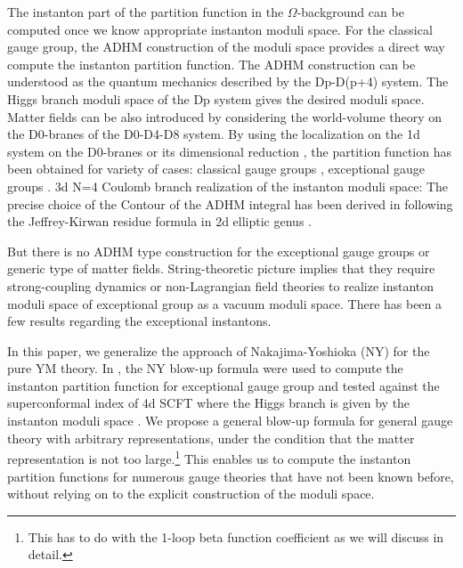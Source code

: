 \documentclass[letterpaper, 11pt]{article}
\begin{document}
The instanton part of the partition function in the $\Omega$-background can be computed once we know appropriate instanton moduli space. For the classical gauge group, the ADHM construction of the moduli space provides a direct way compute the instanton partition function. The ADHM construction can be understood as the quantum mechanics described by the Dp-D(p+4) system. The Higgs branch moduli space of the Dp system gives the desired moduli space. Matter fields can be also introduced by considering the world-volume theory on the D0-branes of the D0-D4-D8 system. 
By using the localization on the 1d system on the D0-branes or its dimensional reduction \cite{Moore:1997dj, Bruzzo:2002xf}, the partition function has been obtained for variety of cases: classical gauge groups \cite{Nekrasov:2004vw, Marino:2004cn, Fucito:2004gi, Hollands:2010xa, Hollands:2011zc}, exceptional gauge groups \cite{Benvenuti:2010pq, Keller:2011ek, Keller:2012da, Hanany:2012dm}. 
3d N=4 Coulomb branch realization of the instanton moduli space: \cite{Cremonesi:2014xha}
The precise choice of the Contour of the ADHM integral has been derived in \cite{Hwang:2014uwa, Hori:2014tda, Cordova:2014oxa} following the Jeffrey-Kirwan residue formula in 2d elliptic genus \cite{Benini:2013xpa,Benini:2013nda}. 

But there is no ADHM type construction for the exceptional gauge groups or generic type of matter fields. String-theoretic picture implies that they require strong-coupling dynamics or non-Lagrangian field theories to realize instanton moduli space of exceptional group as a vacuum moduli space. There has been a few results regarding the exceptional instantons. 

In this paper, we generalize the approach of Nakajima-Yoshioka (NY) \cite{Nakajima:2003pg,Nakajima:2003uh,Nakajima:2005fg} for the pure YM theory. In \cite{Keller:2012da}, the NY blow-up formula were used to compute the instanton partition function for exceptional gauge group and tested against the superconformal index of 4d SCFT where the Higgs branch is given by the instanton moduli space \cite{Gaiotto:2012uq}. We propose a general blow-up formula for general gauge theory with arbitrary representations, under the condition that the matter representation is not too large.\footnote{This has to do with the 1-loop beta function coefficient  as we will discuss in detail.} This enables us to compute the instanton partition functions for numerous gauge theories that have not been known before, without relying on to the explicit construction of the moduli space. 
\end{document}
